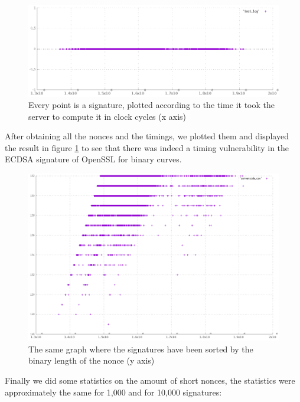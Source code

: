 \documentclass[a4paper,11pt]{article}
\begin{document}
\begin{figure}[H]
\includegraphics[width=\textwidth]{serverside_scrambled.png}
\caption{Every point is a signature, plotted according to the time it took the server to compute it in clock cycles (x axis)}
\end{figure}

After obtaining all the nonces and the timings, we plotted them and displayed the result in figure \ref{fig:serverside} to see that there was indeed a timing vulnerability in the ECDSA signature of OpenSSL for binary curves.

\begin{figure}[H]
\includegraphics[width=\textwidth]{serverside.png}
\caption{The same graph where the signatures have been sorted by the binary length of the nonce (y axis)}
\label{fig:serverside}
\end{figure}

Finally we did some statistics on the amount of short nonces, the statistics were approximately the same for 1,000 and for 10,000 signatures:
\end{document}
